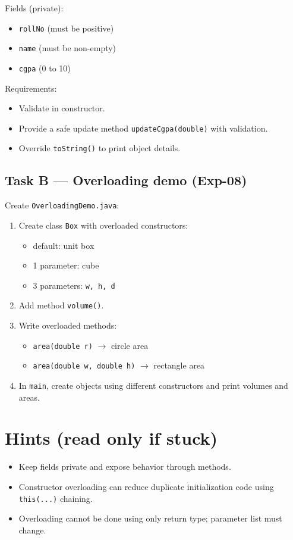\documentclass[11pt]{article}
\begin{document}
\noindent Fields (private):
\begin{itemize}[leftmargin=*]
  \item \texttt{rollNo} (must be positive)
  \item \texttt{name} (must be non-empty)
  \item \texttt{cgpa} (0 to 10)
\end{itemize}

\noindent Requirements:
\begin{itemize}[leftmargin=*]
  \item Validate in constructor.
  \item Provide a safe update method \texttt{updateCgpa(double)} with validation.
  \item Override \texttt{toString()} to print object details.
\end{itemize}

\subsection{Task B --- Overloading demo (Exp-08)}
Create \texttt{OverloadingDemo.java}:
\begin{enumerate}[leftmargin=*]
  \item Create class \texttt{Box} with overloaded constructors:
  \begin{itemize}[leftmargin=*]
    \item default: unit box
    \item 1 parameter: cube
    \item 3 parameters: \texttt{w, h, d}
  \end{itemize}
  \item Add method \texttt{volume()}.
  \item Write overloaded methods:
  \begin{itemize}[leftmargin=*]
    \item \texttt{area(double r)} $\rightarrow$ circle area
    \item \texttt{area(double w, double h)} $\rightarrow$ rectangle area
  \end{itemize}
  \item In \texttt{main}, create objects using different constructors and print volumes and areas.
\end{enumerate}

\section{Hints (read only if stuck)}
\begin{itemize}[leftmargin=*]
  \item Keep fields private and expose behavior through methods.
  \item Constructor overloading can reduce duplicate initialization code using \texttt{this(...)} chaining.
  \item Overloading cannot be done using only return type; parameter list must change.
\end{itemize}
\end{document}

